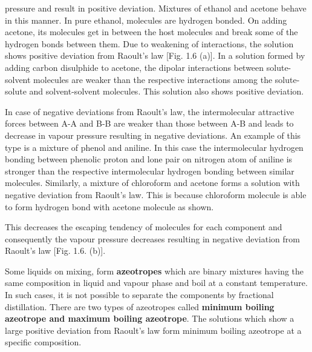 \documentclass[11pt,a4paper]{article}
\begin{document}
\noindent\hfill\begin{minipage}[t]{0.735\textwidth}
pressure and result in positive deviation. Mixtures of ethanol and acetone behave in this manner. In pure ethanol, molecules are hydrogen bonded. On adding acetone, its molecules get in between the host molecules and break some of the hydrogen bonds between them. Due to weakening of interactions, the solution shows positive deviation from Raoult's law [Fig. 1.6 (a)]. In a solution formed by adding carbon disulphide to acetone, the dipolar interactions between solute-solvent molecules are weaker than the respective interactions among the solute-solute and solvent-solvent molecules. This solution also shows positive deviation.

\hspace*{1.5em}In case of negative deviations from Raoult's law, the intermolecular attractive forces between A-A and B-B are weaker than those between A-B and leads to decrease in vapour pressure resulting in negative deviations. An example of this type is a mixture of phenol and aniline. In this case the intermolecular hydrogen bonding between phenolic proton and lone pair on nitrogen atom of aniline is stronger than the respective intermolecular hydrogen bonding between similar molecules. Similarly, a mixture of chloroform and acetone forms a solution with negative deviation from Raoult's law. This is because chloroform molecule is able to form hydrogen bond with acetone molecule as shown.

\vspace{4pt}
\hspace*{3em}
\vspace{4pt}

\hspace*{1.5em}This decreases the escaping tendency of molecules for each component and consequently the vapour pressure decreases resulting in negative deviation from Raoult's law [Fig. 1.6. (b)].

\hspace*{1.5em}Some liquids on mixing, form \textbf{azeotropes} which are binary mixtures having the same composition in liquid and vapour phase and boil at a constant temperature. In such cases, it is not possible to separate the components by fractional distillation. There are two types of azeotropes called \textbf{minimum boiling azeotrope and maximum boiling azeotrope}. The solutions which show a large positive deviation from Raoult's law form minimum boiling azeotrope at a specific composition.
\end{minipage}
\end{document}
